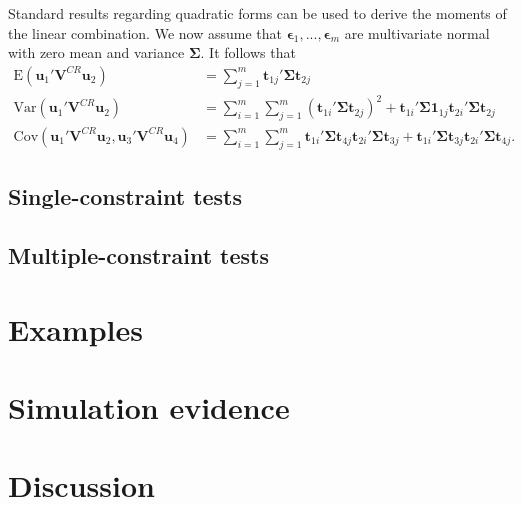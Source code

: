 \documentclass[12pt]{article}\usepackage[]{graphicx}\usepackage[]{color}
\newcommand{\E}{\text{E}}
\newcommand{\Cov}{\text{Cov}}
\newcommand{\Var}{\text{Var}}
\newcommand{\bm}{\mathbf}
\newcommand{\bs}{\boldsymbol}
\begin{document}
Standard results regarding quadratic forms can be used to derive the moments of the linear combination. We now assume that $\bs\epsilon_1,...,\bs\epsilon_m$ are multivariate normal with zero mean and variance $\bs\Sigma$. It follows that 
\begin{align}
\E\left(\bm{u}_1' \bm{V}^{CR} \bm{u}_2\right) &= \sum_{j=1}^m \bm{t}_{1j}' \bs\Sigma \bm{t}_{2j} \\
\Var\left(\bm{u}_1' \bm{V}^{CR} \bm{u}_2\right) &= \sum_{i=1}^m \sum_{j=1}^m \left(\bm{t}_{1i}' \bs\Sigma \bm{t}_{2j}\right)^2 + \bm{t}_{1i}' \bs\Sigma \bm{1}_{1j} \bm{t}_{2i}' \bs\Sigma \bm{t}_{2j} \\
\Cov\left(\bm{u}_1' \bm{V}^{CR} \bm{u}_2, \bm{u}_3' \bm{V}^{CR} \bm{u}_4\right) &= \sum_{i=1}^m \sum_{j=1}^m \bm{t}_{1i}' \bs\Sigma \bm{t}_{4j} \bm{t}_{2i}' \bs\Sigma \bm{t}_{3j} + \bm{t}_{1i}' \bs\Sigma \bm{t}_{3j} \bm{t}_{2i}' \bs\Sigma \bm{t}_{4j}.
\end{align}


\subsection{Single-constraint tests}

\subsection{Multiple-constraint tests}

\section{Examples}
\label{sec:examples}

\section{Simulation evidence}
\label{sec:simulations}

\section{Discussion}
\label{sec:discussion}



\end{document}
